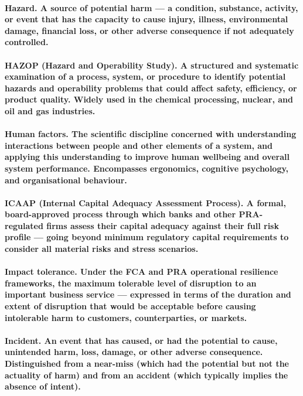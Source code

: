 \paragraph{\textbf{Hazard}. A source of potential harm — a condition, substance, activity, or event that has the capacity to cause injury, illness, environmental damage, financial loss, or other adverse consequence if not adequately controlled.}

\paragraph{\textbf{HAZOP (Hazard and Operability Study)}. A structured and systematic examination of a process, system, or procedure to identify potential hazards and operability problems that could affect safety, efficiency, or product quality. Widely used in the chemical processing, nuclear, and oil and gas industries.}

\paragraph{\textbf{Human factors}. The scientific discipline concerned with understanding interactions between people and other elements of a system, and applying this understanding to improve human wellbeing and overall system performance. Encompasses ergonomics, cognitive psychology, and organisational behaviour.}

\paragraph{\textbf{ICAAP (Internal Capital Adequacy Assessment Process)}. A formal, board-approved process through which banks and other PRA-regulated firms assess their capital adequacy against their full risk profile — going beyond minimum regulatory capital requirements to consider all material risks and stress scenarios.}

\paragraph{\textbf{Impact tolerance}. Under the FCA and PRA operational resilience frameworks, the maximum tolerable level of disruption to an important business service — expressed in terms of the duration and extent of disruption that would be acceptable before causing intolerable harm to customers, counterparties, or markets.}

\paragraph{\textbf{Incident}. An event that has caused, or had the potential to cause, unintended harm, loss, damage, or other adverse consequence. Distinguished from a near-miss (which had the potential but not the actuality of harm) and from an accident (which typically implies the absence of intent).}

